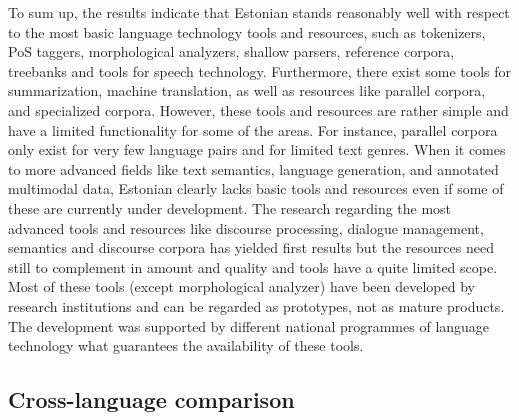 \documentclass[]{../metanetpaper}
\begin{document}
\begin{multicols}{2}
\begin{itemize}
\end{itemize}

To sum up, the results indicate that Estonian stands reasonably well with respect to the most basic language technology tools and resources, such as tokenizers, PoS taggers, morphological analyzers, shallow parsers, reference corpora, treebanks and tools for speech technology. Furthermore, there exist some tools for summarization, machine translation, as well as resources like parallel corpora, and specialized corpora. However, these tools and resources are rather simple and have a limited functionality for some of the areas. For instance, parallel corpora only exist for very few language pairs and for limited text genres.
When it comes to more advanced fields like text semantics, language generation, and annotated multimodal data, Estonian clearly lacks basic tools and resources even if some of these are currently under development. 
The research regarding the most advanced tools and resources like discourse processing, dialogue management, semantics and discourse corpora has yielded first results but the resources need still to complement in amount and quality and tools have a quite limited scope.
Most of these tools (except morphological analyzer) have been developed by research institutions and can be regarded as prototypes, not as mature products. The development was supported by different national programmes of language technology what guarantees the availability of these tools.

\subsection{Cross-language comparison}


\end{multicols}
\end{document}
